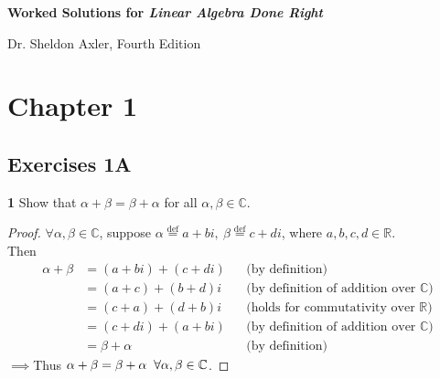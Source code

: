 \documentclass{article}
\begin{document}
\begin{titlepage}
   \begin{center}
       \vspace*{1cm}

       \textbf{Worked Solutions for \textit{Linear Algebra Done Right}}

       \vspace{0.5cm}
        Dr. Sheldon Axler, Fourth Edition
            
       \vspace{0.8cm}


       \vfill
            
       
            
       \vspace{0.8cm}
     
    
            
       
            
   \end{center}
\end{titlepage}


\section*{Chapter 1}

\subsection*{Exercises 1A}

\textbf{1} \hspace{3 mm} Show that $\alpha + \beta = \beta + \alpha$ for all $\alpha, \beta \in \mathbb{C}$. \color{red}

\begin{proof}
    $\forall \alpha, \beta \in \mathbb{C}$, suppose $\alpha \stackrel{\text{def}}{=} a + bi, \  \beta \stackrel{\text{def}}{=} c + di$, where $a, b, c, d \in \mathbb{R}$.\\
    \indent Then
    \begin{align*}
        \alpha + \beta &= (a + bi) + (c + di) &&\text{(by definition)}\\
            &= (a + c) + (b + d)i &&\text{(by definition of addition over $\mathbb{C}$)}\\
            &= (c + a) + (d + b)i &&\text{(holds for commutativity over $\mathbb{R}$)}\\
            &= (c + di) + (a + bi) &&\text{(by definition of addition over $\mathbb{C}$)}\\
            &= \beta + \alpha &&\text{(by definition)}
    \end{align*}
    $\implies$Thus $\alpha + \beta = \beta + \alpha \hspace{2 mm} \forall \alpha, \beta \in \mathbb{C}$. 
    
\end{proof}
\color{black}
\end{document}
